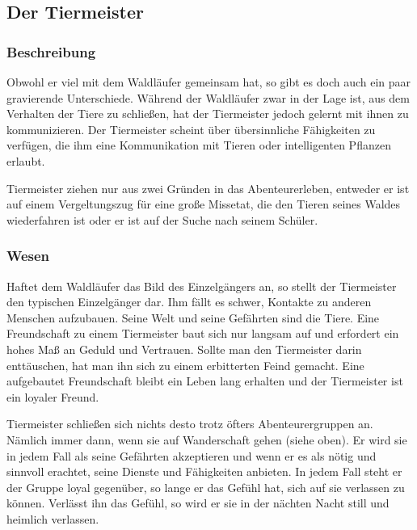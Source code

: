 \subsection{Der Tiermeister}
\subsubsection{Beschreibung}
\par Obwohl er viel mit dem Waldläufer gemeinsam hat, so gibt es doch auch ein paar gravierende Unterschiede. 
Während der Waldläufer zwar in der Lage ist, aus dem Verhalten der Tiere zu schließen, hat der Tiermeister 
jedoch gelernt mit ihnen zu kommunizieren.
Der Tiermeister scheint über übersinnliche Fähigkeiten zu verfügen, die ihm eine Kommunikation mit Tieren 
oder \glqq intelligenten\grqq{} Pflanzen erlaubt.
\par Tiermeister ziehen nur aus zwei Gründen in das Abenteurerleben, entweder er ist auf einem Vergeltungszug für 
eine große Missetat, die den Tieren seines Waldes wiederfahren ist oder er ist auf der Suche nach seinem Schüler.
\subsubsection{Wesen}
\par Haftet dem Waldläufer das Bild des Einzelgängers an, so stellt der Tiermeister den typischen Einzelgänger 
dar. Ihm fällt es schwer, Kontakte zu anderen Menschen aufzubauen. Seine Welt und seine Gefährten sind die Tiere.
 Eine Freundschaft zu einem Tiermeister baut sich nur langsam auf und erfordert ein hohes Maß an Geduld und 
 Vertrauen. Sollte man den Tiermeister darin enttäuschen, hat man ihn sich zu einem erbitterten Feind gemacht. 
 Eine aufgebautet Freundschaft bleibt ein Leben lang erhalten und der Tiermeister ist ein loyaler Freund.
\par Tiermeister schließen sich nichts desto trotz öfters Abenteurergruppen an. Nämlich immer dann, wenn sie 
auf Wanderschaft gehen (siehe oben). Er wird sie in jedem Fall als seine Gefährten akzeptieren und wenn er es 
als nötig und sinnvoll erachtet, seine Dienste und Fähigkeiten anbieten. In jedem Fall steht er der Gruppe 
loyal gegenüber, so lange er das Gefühl hat, sich auf sie verlassen zu können. Verlässt ihn das Gefühl, 
so wird er sie in der nächten Nacht still und heimlich verlassen.
